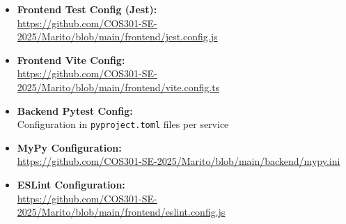 \documentclass[12pt,a4paper]{article}
\begin{document}
\begin{itemize}
    \item \textbf{Frontend Test Config (Jest):} \\
    \url{https://github.com/COS301-SE-2025/Marito/blob/main/frontend/jest.config.js}
    
    \item \textbf{Frontend Vite Config:} \\
    \url{https://github.com/COS301-SE-2025/Marito/blob/main/frontend/vite.config.ts}
    
    \item \textbf{Backend Pytest Config:} \\
    Configuration in \texttt{pyproject.toml} files per service
    
    \item \textbf{MyPy Configuration:} \\
    \url{https://github.com/COS301-SE-2025/Marito/blob/main/backend/mypy.ini}
    
    \item \textbf{ESLint Configuration:} \\
    \url{https://github.com/COS301-SE-2025/Marito/blob/main/frontend/eslint.config.js}
\end{itemize}
\end{document}
